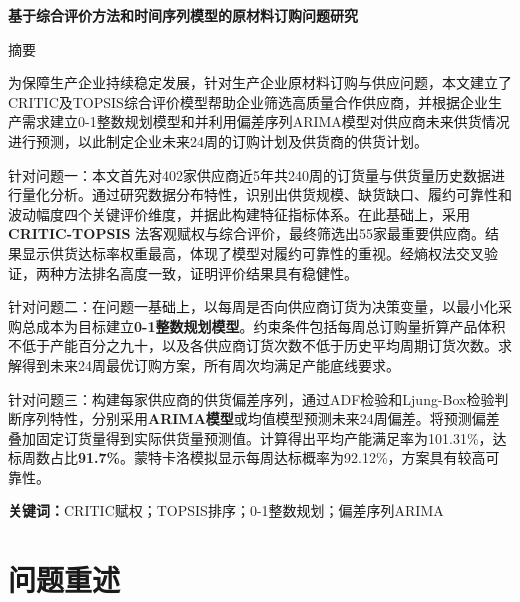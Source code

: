 \documentclass[12pt,a4paper]{ctexart}
\theoremstyle{definition}
\theoremstyle{plain}
\theoremstyle{remark}
\renewenvironment{abstract}
  {\begin{center}\heiti\zihao{-3}摘\quad 要\end{center}\zihao{-4}\songti}
  {\par\vspace{1em}}
\newcommand{\keywords}[1]{%
  \par\noindent\textbf{关键词：}#1}
\begin{document}
\pagestyle{plain}

\begin{center}
{\heiti\bfseries 基于综合评价方法和时间序列模型的原材料订购问题研究}
\end{center}
\vspace{1em}

\setcounter{page}{1}

\begin{abstract}
  
为保障生产企业持续稳定发展，针对生产企业原材料订购与供应问题，本文建立了CRITIC及TOPSIS综合评价模型帮助企业筛选高质量合作供应商，并根据企业生产需求建立0-1整数规划模型和并利用偏差序列ARIMA模型对供应商未来供货情况进行预测，以此制定企业未来24周的订购计划及供货商的供货计划。

{\heiti 针对问题一：}本文首先对402家供应商近5年共240周的订货量与供货量历史数据进行量化分析。通过研究数据分布特性，识别出供货规模、缺货缺口、履约可靠性和波动幅度四个关键评价维度，并据此构建特征指标体系。在此基础上，采用 \textbf{CRITIC-TOPSIS} 法客观赋权与综合评价，最终筛选出55家最重要供应商。结果显示供货达标率权重最高，体现了模型对履约可靠性的重视。经熵权法交叉验证，两种方法排名高度一致，证明评价结果具有稳健性。

{\heiti 针对问题二：}在问题一基础上，以每周是否向供应商订货为决策变量，以最小化采购总成本为目标建立\textbf{0-1整数规划模型}。约束条件包括每周总订购量折算产品体积不低于产能百分之九十，以及各供应商订货次数不低于历史平均周期订货次数。求解得到未来24周最优订购方案，所有周次均满足产能底线要求。

{\heiti 针对问题三：}构建每家供应商的供货偏差序列，通过ADF检验和Ljung-Box检验判断序列特性，分别采用\textbf{ARIMA模型}或均值模型预测未来24周偏差。将预测偏差叠加固定订货量得到实际供货量预测值。计算得出平均产能满足率为101.31\%，达标周数占比\textbf{91.7\%}。蒙特卡洛模拟显示每周达标概率为92.12\%，方案具有较高可靠性。
\end{abstract}

\keywords{CRITIC赋权；TOPSIS排序；0-1整数规划；偏差序列ARIMA}

\newpage


\section{问题重述}
\end{document}

